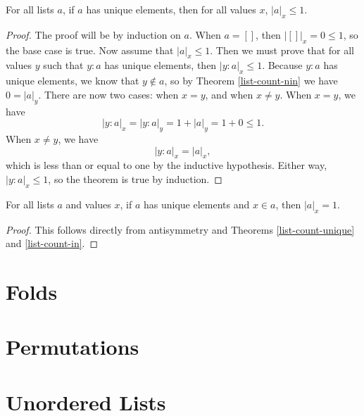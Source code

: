 \documentclass[../math.tex]{subfiles}
\begin{document}
\begin{theorem} \label{list-count-unique}
    For all lists $a$, if $a$ has unique elements, then for all values $x$,
    $|a|_x \leq 1$.
\end{theorem}
\begin{proof}
    The proof will be by induction on $a$.  When $a = []$, then $|[]|_x = 0 \leq
    1$, so the base case is true.  Now assume that $|a|_x \leq 1$.  Then we must
    prove that for all values $y$ such that $y : a$ has unique elements, then
    $|y : a|_x \leq 1$.  Because $y : a$ has unique elements, we know that $y
    \notin a$, so by Theorem \ref{list-count-nin} we have $0 = |a|_y$.  There
    are now two cases: when $x = y$, and when $x \neq y$.  When $x = y$, we have
    \[
        |y : a|_x = |y : a|_y = 1 + |a|_y = 1 + 0 \leq 1.
    \]
    When $x \neq y$, we have
    \[
        |y : a|_x = |a|_x,
    \]
    which is less than or equal to one by the inductive hypothesis.  Either way,
    $|y : a|_x \leq 1$, so the theorem is true by induction.
\end{proof}

\begin{theorem} \label{list-count-in-unique}
    For all lists $a$ and values $x$, if $a$ has unique elements and $x \in a$,
    then $|a|_x = 1$.
\end{theorem}
\begin{proof}
    This follows directly from antisymmetry and Theorems \ref{list-count-unique}
    and \ref{list-count-in}.
\end{proof}

\section{Folds}

\section{Permutations}

\section{Unordered Lists}
\end{document}
